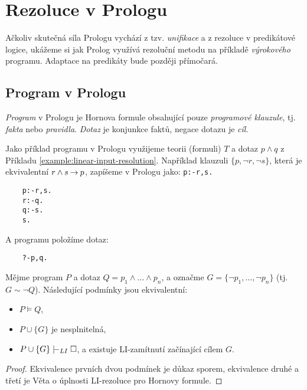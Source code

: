 \section{Rezoluce v Prologu}

Ačkoliv skutečná síla Prologu vychází z tzv. \emph{unifikace} a z rezoluce v predikátové logice, ukážeme si jak Prolog využívá rezoluční metodu na příkladě \emph{výrokového} programu. Adaptace na predikáty bude později přímočará.

\subsection{Program v Prologu}

\emph{Program} v Prologu je Hornova formule obsahující pouze \emph{programové klauzule}, tj. \emph{fakta} nebo \emph{pravidla}. \emph{Dotaz} je konjunkce faktů, negace dotazu je \emph{cíl}.

\begin{example}
Jako příklad programu v Prologu využijeme teorii (formuli) $T$ a dotaz $p\land q$ z Příkladu \ref{example:linear-input-resolution}. Například klauzuli $\{p,\neg r,\neg s\}$, která je ekvivalentní $r\land s\mathbin{\rightarrow} p$, zapíšeme v Prologu jako: \texttt{p:-r,s.}
\begin{verbatim}
    p:-r,s.
    r:-q.
    q:-s.
    s.    
\end{verbatim}
A programu položíme dotaz:
\begin{verbatim}
    ?-p,q.    
\end{verbatim}
\end{example}

\begin{corollary}
    Mějme program $P$ a dotaz $Q=p_1\land\dots\land p_n$, a označme $G=\{\neg p_1,\dots,\neg p_n\}$ (tj. $G\sim \neg Q$). Následující podmínky jsou ekvivalentní:
    \begin{itemize}
        \item $P\models Q$,
        \item $P\cup\{G\}$ je nesplnitelná,
        \item $P\cup\{G\}\proves_{LI}\square$, a existuje LI-zamítnutí začínající cílem $G$.
    \end{itemize}
\end{corollary}
\begin{proof}
    Ekvivalence prvních dvou podmínek je důkaz sporem, ekvivalence druhé a třetí je Věta o úplnosti LI-rezoluce pro Hornovy formule.
\end{proof}

